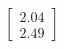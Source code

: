 \documentclass[preview]{standalone}
\begin{document}
\begin{align*}
\begin{bmatrix} 2.04 \\ 2.49 \end{bmatrix}
\end{align*}
\end{document}
